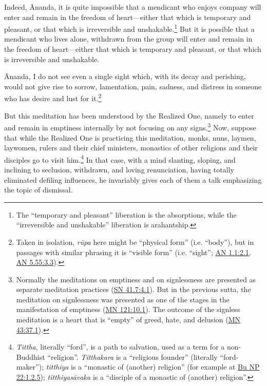 \documentclass[12pt,openany]{book}%
\begin{document}
Indeed, Ānanda, it is quite impossible that a mendicant who enjoys company will enter and remain in the freedom of heart—either that which is temporary and pleasant, or that which is irreversible and unshakable.\footnote{The “temporary and pleasant” liberation is the absorptions, while the “irreversible and unshakable” liberation is arahantship. } But it is possible that a mendicant who lives alone, withdrawn from the group will enter and remain in the freedom of heart—either that which is temporary and pleasant, or that which is irreversible and unshakable. 

Ānanda, I do not see even a single sight which, with its decay and perishing, would not give rise to sorrow, lamentation, pain, sadness, and distress in someone who has desire and lust for it.\footnote{Taken in isolation, \textit{\textsanskrit{rūpa}} here might be “physical form” (i.e. “body”), but in passages with similar phrasing it is “visible form” (i.e. “sight”; \href{https://suttacentral.net/an1.1/en/sujato\#2.1}{AN 1.1:2.1}, \href{https://suttacentral.net/an5.55/en/sujato\#3.3}{AN 5.55:3.3}). } 

But this meditation has been understood by the Realized One, namely to enter and remain in emptiness internally by not focusing on any signs.\footnote{Normally the meditations on emptiness and on signlessness are presented as separate  meditation practices (\href{https://suttacentral.net/sn41.7/en/sujato\#4.1}{SN 41.7:4.1}). But in the previous sutta, the meditation on signlessness was presented as one of the stages in the manifestation of emptiness (\href{https://suttacentral.net/mn121/en/sujato\#10.1}{MN 121:10.1}). The outcome of the signless meditation is a heart that is “empty” of greed, hate, and delusion (\href{https://suttacentral.net/mn43/en/sujato\#37.1}{MN 43:37.1}). } Now, suppose that while the Realized One is practicing this meditation, monks, nuns, laymen, laywomen, rulers and their chief ministers, monastics of other religions and their disciples go to visit him.\footnote{\textit{Tittha}, literally “ford”, is a path to salvation, used as a term for a non-Buddhist “religion”. \textit{Titthakara} is a “religious founder” (literally “ford-maker”); \textit{titthiya} is a “monastic of (another) religion” (for example at \href{https://suttacentral.net/pli-tv-bu-vb-np22/en/sujato\#1.2.5}{Bu NP 22:1.2.5}); \textit{\textsanskrit{titthiyasāvaka}} is a “disciple of a monastic of (another) religion”. } In that case, with a mind slanting, sloping, and inclining to seclusion, withdrawn, and loving renunciation, having totally eliminated defiling influences, he invariably gives each of them a talk emphasizing the topic of dismissal. 
\end{document}
